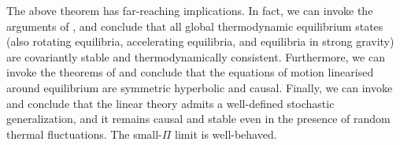 \documentclass[a4paper, amsfonts, amssymb, amsmath, reprint, showkeys, nofootinbib, twoside,notitlepage,onecolumn]{revtex4-2}
\theoremstyle{definition}
\theoremstyle{theorem}
\theoremstyle{corollary}
\begin{document}
The above theorem has far-reaching implications. In fact, we can invoke the arguments of \cite{Hishcock1983,GavassinoGibbs2021,GavassinoCasmir2022}, and conclude that all global thermodynamic equilibrium states (also rotating equilibria, accelerating equilibria, and equilibria in strong gravity) are covariantly stable and thermodynamically consistent.  Furthermore, we can invoke the theorems of \cite{GavassinoCausality2021,GavassinoUniversalityI2023} and conclude that the equations of motion linearised around equilibrium are symmetric hyperbolic and causal. Finally, we can invoke \cite{MullinsHippert2023tjg,Gavassino2024Fluctuazia} and conclude that the linear theory admits a well-defined stochastic generalization, and it remains causal and stable even in the presence of random thermal fluctuations. The small-$\Pi$ limit is well-behaved.











\end{document}
